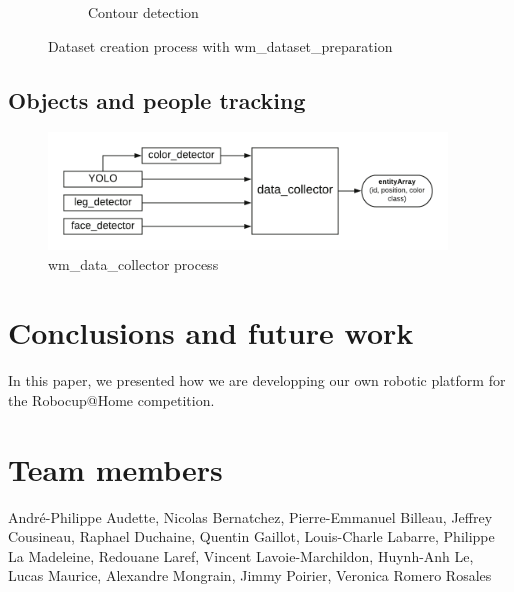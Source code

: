\documentclass[runningheads,a4paper]{llncs}
\begin{document}
\begin{figure}[h!]
\begin{subfigure}[b]{0.3\linewidth}
    \caption{Contour detection}
  \end{subfigure}
  \caption{Dataset creation process with wm\_dataset\_preparation}
  \label{fig:coffee}
\end{figure}  
 

\subsection{Objects and people tracking}

\begin{figure}
  \centering
  \includegraphics[width=300pt]{images/wm_data_collector.png}
  \caption{ wm\_data\_collector process}
\end{figure} 

\newpage

\section{Conclusions and future work} 
\tab In this paper, we presented how we are developping our own robotic platform for the Robocup@Home competition. 


	
\section*{Team members}
André-Philippe Audette,
Nicolas Bernatchez,
Pierre-Emmanuel Billeau,
Jeffrey Cousineau, 
Raphael Duchaine,
Quentin Gaillot,
Louis-Charle Labarre, 
Philippe La Madeleine,  
Redouane Laref,
Vincent Lavoie-Marchildon,
Huynh-Anh Le,
Lucas Maurice,
Alexandre Mongrain,
Jimmy Poirier,
Veronica Romero Rosales

\nocite{*}


\end{document}
